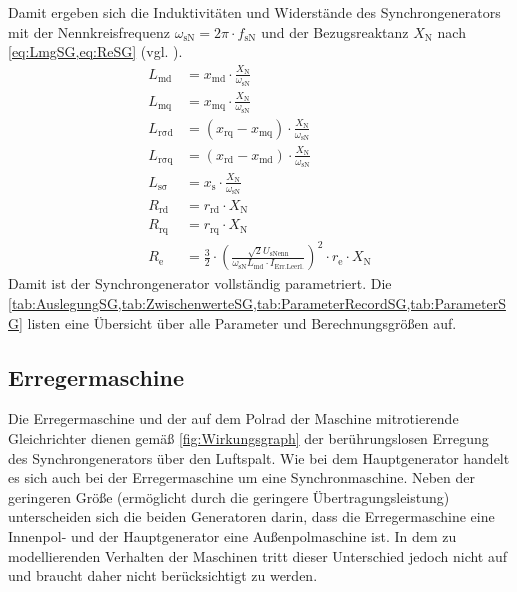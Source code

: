 Damit ergeben sich die Induktivitäten und Widerstände des
Synchrongenerators mit der Nennkreisfrequenz
\(\omega_{\mathrm{sN}}=2\pi\cdot f_{\mathrm{sN}}\) und der
Bezugsreaktanz \(X_{\mathrm{N}}\) nach \cref{eq:LmgSG,eq:ReSG} (vgl.
\cite[S.265f.]{kralModelicaObjektorientierteModellbildung2019}).
\begin{align}
L_{\mathrm{md}} &= x_{\mathrm{md}}\cdot \frac{X_{\mathrm{N}}}{\omega_{\mathrm{sN}}} \label{eq:LmgSG}\\
L_{\mathrm{mq}} &= x_{\mathrm{mq}}\cdot \frac{X_{\mathrm{N}}}{\omega_{\mathrm{sN}}} \\
L_{\mathrm{r \sigma d}} &= (x_{\mathrm{rq}}-x_{\mathrm{mq}})\cdot \frac{X_{\mathrm{N}}}{\omega_{\mathrm{sN}}} \\
L_{\mathrm{r \sigma q}} &= (x_{\mathrm{rd}}-x_{\mathrm{md}})\cdot \frac{X_{\mathrm{N}}}{\omega_{\mathrm{sN}}} \\
L_{\mathrm{s \sigma}} &= x_{\mathrm{s}}\cdot \frac{X_{\mathrm{N}}}{\omega_{\mathrm{sN}}} \\
R_{\mathrm{rd}} &= r_{\mathrm{rd}}\cdot X_{\mathrm{N}} \\
R_{\mathrm{rq}} &= r_{\mathrm{rq}}\cdot X_{\mathrm{N}} \\
R_{\mathrm{e}} &= \frac{3}{2}\cdot \left(\frac{\sqrt{2}U_{\mathrm{sNenn}}}{\omega_{\mathrm{sN}}L_{\mathrm{md}}\cdot I_{\mathrm{Err. Leerl.}}}\right)^2\cdot r_{\mathrm{e}}\cdot X_{\mathrm{N}}\label{eq:ReSG}
\end{align}
Damit ist der Synchrongenerator vollständig parametriert. Die \cref{tab:AuslegungSG,tab:ZwischenwerteSG,tab:ParameterRecordSG,tab:ParameterSG} listen eine Übersicht über alle Parameter und Berechnungsgrößen auf.

\subsection{Erregermaschine}\label{sec:erregermaschine}

Die Erregermaschine und der auf dem Polrad der Maschine mitrotierende Gleichrichter dienen gemäß \cref{fig:Wirkungsgraph} der berührungslosen Erregung des Synchrongenerators über den Luftspalt. Wie bei dem Hauptgenerator handelt es sich auch bei der Erregermaschine um eine Synchronmaschine. Neben der geringeren Größe (ermöglicht durch die geringere Übertragungsleistung) unterscheiden sich die beiden Generatoren darin, dass die Erregermaschine eine Innenpol- und der Hauptgenerator eine Außenpolmaschine ist. In dem zu modellierenden Verhalten der Maschinen tritt dieser Unterschied jedoch nicht auf und braucht daher nicht berücksichtigt zu werden.

